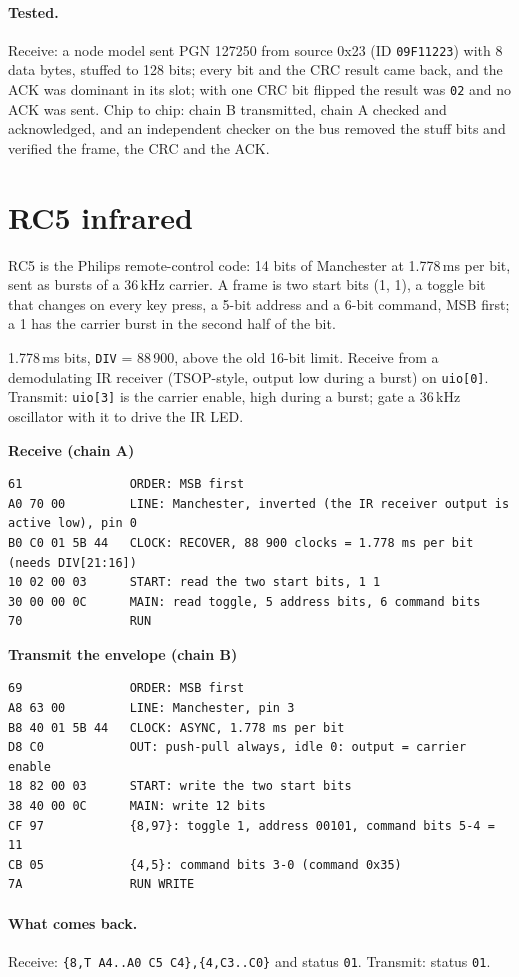 \documentclass[11pt,a4paper]{article}
\newcommand{\sig}[1]{\texttt{#1}}
\newcommand{\progtitle}[1]{\par\smallskip\textbf{\small\color{accent}#1}\par\nopagebreak}
\newcommand{\facts}[1]{\par\noindent\colorbox{codebg}{\parbox{\dimexpr\linewidth-2\fboxsep}{\small #1}}\par}
\begin{document}
\paragraph{Tested.} Receive: a node model sent PGN 127250 from source 0x23 (ID \texttt{09F11223}) with 8 data bytes, stuffed to 128 bits; every bit and the CRC result came back, and the ACK was dominant in its slot; with one CRC bit flipped the result was \texttt{02} and no ACK was sent. Chip to chip: chain B transmitted, chain A checked and acknowledged, and an independent checker on the bus removed the stuff bits and verified the frame, the CRC and the ACK.
\section{RC5 infrared}
RC5 is the Philips remote-control code: 14 bits of Manchester at 1.778\,ms per bit, sent as bursts of a 36\,kHz carrier. A frame is two start bits (1, 1), a toggle bit that changes on every key press, a 5-bit address and a 6-bit command, MSB first; a 1 has the carrier burst in the second half of the bit.
\facts{1.778\,ms bits, \sig{DIV} = 88\,900, above the old 16-bit limit. Receive from a demodulating IR receiver (TSOP-style, output low during a burst) on \sig{uio[0]}. Transmit: \sig{uio[3]} is the carrier enable, high during a burst; gate a 36\,kHz oscillator with it to drive the IR LED.}
\progtitle{Receive (chain A)}
\begin{lstlisting}
61               ORDER: MSB first
A0 70 00         LINE: Manchester, inverted (the IR receiver output is active low), pin 0
B0 C0 01 5B 44   CLOCK: RECOVER, 88 900 clocks = 1.778 ms per bit (needs DIV[21:16])
10 02 00 03      START: read the two start bits, 1 1
30 00 00 0C      MAIN: read toggle, 5 address bits, 6 command bits
70               RUN
\end{lstlisting}
\progtitle{Transmit the envelope (chain B)}
\begin{lstlisting}
69               ORDER: MSB first
A8 63 00         LINE: Manchester, pin 3
B8 40 01 5B 44   CLOCK: ASYNC, 1.778 ms per bit
D8 C0            OUT: push-pull always, idle 0: output = carrier enable
18 82 00 03      START: write the two start bits
38 40 00 0C      MAIN: write 12 bits
CF 97            {8,97}: toggle 1, address 00101, command bits 5-4 = 11
CB 05            {4,5}: command bits 3-0 (command 0x35)
7A               RUN WRITE
\end{lstlisting}
\paragraph{What comes back.} Receive: \texttt{\{8,T A4..A0 C5 C4\},\{4,C3..C0\}} and status \texttt{01}. Transmit: status \texttt{01}.
\end{document}
